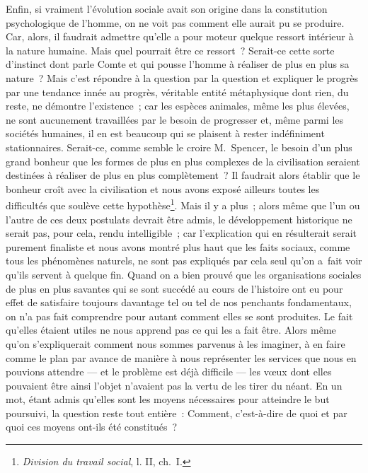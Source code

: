 \documentclass[french,twoside]{book} %
\begin{document}
Enfin, si vraiment l’évolution sociale avait son origine dans la constitution psychologique de l’homme, on ne voit pas comment elle aurait pu se produire. Car, alors, il faudrait admettre qu’elle a pour moteur quelque ressort intérieur à la nature humaine. Mais quel pourrait être ce ressort ? Serait-ce cette sorte d’instinct dont parle Comte et qui pousse l’homme à réaliser de plus en plus sa nature ? Mais c’est répondre à la question par la question et expliquer le progrès par une tendance innée au progrès, véritable entité métaphysique dont rien, du reste, ne démontre l’existence ; car les espèces animales, même les plus élevées, ne sont aucunement travaillées par le besoin de progresser et, même parmi les sociétés humaines, il en est beaucoup qui se plaisent à rester indéfiniment stationnaires. Serait-ce, comme semble le croire M. Spencer, le besoin d’un plus grand bonheur que les formes de plus en plus complexes de la civilisation seraient destinées à réaliser de plus en plus complètement ? Il faudrait alors établir que le bonheur croît avec la civilisation et nous avons exposé ailleurs toutes les difficultés que soulève cette hypothèse\footnote{\emph{Division du travail social}, l. II, ch. I.}. Mais il y a plus ; alors même que l’un ou l’autre de ces deux postulats devrait être admis, le développement historique ne serait pas, pour cela, rendu intelligible ; car l’explication qui en résulterait serait purement finaliste et nous avons montré plus haut que les faits sociaux, comme tous les phénomènes naturels, ne sont pas expliqués par cela seul qu’on a fait voir qu’ils servent à quelque fin. Quand on a bien prouvé que les organisations sociales de plus en plus savantes qui se sont succédé au cours de l’histoire ont eu pour effet de satisfaire toujours davantage tel ou tel de nos penchants fondamentaux, on n’a pas fait comprendre pour autant comment elles se sont produites. Le fait qu’elles étaient utiles ne nous apprend pas ce qui les a fait être. Alors même qu’on s’expliquerait comment nous sommes parvenus à les imaginer, à en faire comme le plan par avance de manière à nous représenter les services que nous en pouvions attendre — et le problème est déjà difficile — les vœux dont elles pouvaient être ainsi l’objet n’avaient pas la vertu de les tirer du néant. En un mot, étant admis qu’elles sont les moyens nécessaires pour atteindre le but poursuivi, la question reste tout entière : Comment, c’est-à-dire de quoi et par quoi ces moyens ont-ils été constitués ?\par
\end{document}

